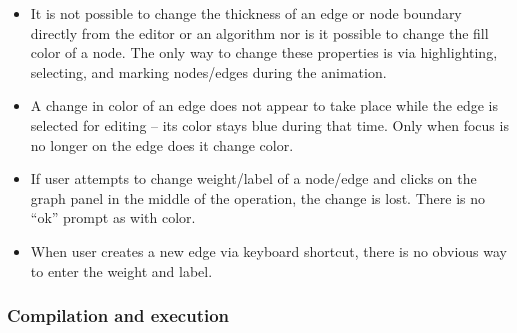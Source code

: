 \begin{itemize}

\item
It is not possible to change the thickness of an edge or node boundary directly
from the editor or an algorithm nor is it possible to change the fill color of a node.
The only way to change these properties is via highlighting, selecting, and
marking nodes/edges during the animation.

\item
A change in color of an edge does not appear to take place while the edge
is selected for editing -- its color stays blue during that time.
Only when focus is no longer on the edge does it change color.

\item If user attempts to change weight/label of a node/edge and clicks on
  the graph panel in the middle of the operation, the change is lost. There
  is no ``ok'' prompt as with color.

\item When user creates a new edge via keyboard shortcut, there is no obvious
  way to enter the weight and label.

\end{itemize}

\subsubsection*{Compilation and execution}

